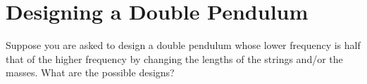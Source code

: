 \documentclass[11pt]{article}
\newenvironment{statement}
{
    \color{darkgray}
    \ignorespaces
}
{
}
\renewcommand{\vec}[1]{\mathbf{#1}}
\begin{document}
\newcommand{\mq}{m_1}
\newcommand{\mw}{m_2}
\newcommand{\elq}{\ell_1}
\newcommand{\elw}{\ell_2}

\newcommand{\thq}{\theta_1}
\newcommand{\thw}{\theta_2}
\newcommand{\thdq}{\dot{\theta}_1}
\newcommand{\thdw}{\dot{\theta}_2}
\newcommand{\thddq}{\ddot{\theta}_1}
\newcommand{\thddw}{\ddot{\theta}_2}

\newcommand{\vrq}{\vec{r}_1}
\newcommand{\vrw}{\vec{r}_2}
\newcommand{\xdq}{\dot{x}_1}
\newcommand{\xdw}{\dot{x}_2}
\newcommand{\yq}{y_1}
\newcommand{\yw}{y_2}
\newcommand{\ydq}{\dot{y}_1}
\newcommand{\ydw}{\dot{y}_2}

\newcommand{\Lh}{\hat{L}}
\newcommand{\vth}{\boldsymbol{\theta}}

\section{Designing a Double Pendulum} \label{prob2}
\begin{statement}
	Suppose you are asked to design a double pendulum whose lower frequency is half that of the higher frequency by changing the lengths of the strings and/or the masses.  What are the possible designs?
\end{statement}
\end{document}
